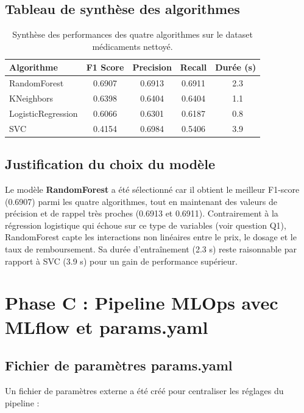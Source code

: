 \documentclass[12pt,a4paper]{report}
\begin{document}
\section{Tableau de synthèse des algorithmes}
\begin{table}[h!]
    \centering
    \begin{tabular}{lccc c}
        \toprule
        \textbf{Algorithme} & \textbf{F1 Score} & \textbf{Precision} & \textbf{Recall} & \textbf{Durée (s)} \\
        \midrule
        RandomForest & 0.6907 & 0.6913 & 0.6911 & ~2.3 \\
        KNeighbors & 0.6398 & 0.6404 & 0.6404 & ~1.1 \\
        LogisticRegression & 0.6066 & 0.6301 & 0.6187 & ~0.8 \\
        SVC & 0.4154 & 0.6984 & 0.5406 & ~3.9 \\
        \bottomrule
    \end{tabular}
    \caption{Synthèse des performances des quatre algorithmes sur le dataset médicaments nettoyé.}
    \label{tab:algo-synthese}
\end{table}

\section{Justification du choix du modèle}
Le modèle \textbf{RandomForest} a été sélectionné car il obtient le meilleur F1-score (0.6907) parmi les quatre algorithmes, tout en maintenant des valeurs de précision et de rappel très proches (0.6913 et 0.6911). Contrairement à la régression logistique qui échoue sur ce type de variables (voir question Q1), RandomForest capte les interactions non linéaires entre le prix, le dosage et le taux de remboursement. Sa durée d'entraînement (2.3 s) reste raisonnable par rapport à SVC (3.9 s) pour un gain de performance supérieur.

\chapter*{Phase C : Pipeline MLOps avec MLflow et params.yaml}

\section{Fichier de paramètres params.yaml}
Un fichier de paramètres externe a été créé pour centraliser les réglages du pipeline :
\end{document}
